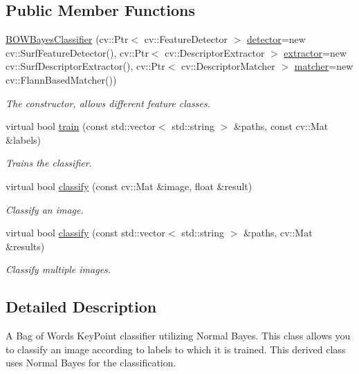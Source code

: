 \subsection*{Public Member Functions}
\begin{DoxyCompactItemize}
\item 
\hyperlink{classBOWBayesClassifier_ab0714186c37d370dfd71b02ff3de81e6}{BOWBayesClassifier} (cv::Ptr$<$ cv::FeatureDetector $>$ \hyperlink{classBOWClassifier_af98420aa410054ef3010f4c098931a41}{detector}=new cv::SurfFeatureDetector(), cv::Ptr$<$ cv::DescriptorExtractor $>$ \hyperlink{classBOWClassifier_a429b9a83879611a7c3e06eeacec9fb18}{extractor}=new cv::SurfDescriptorExtractor(), cv::Ptr$<$ cv::DescriptorMatcher $>$ \hyperlink{classBOWClassifier_a35057956434d92402d24f2628cfaf35c}{matcher}=new cv::FlannBasedMatcher())
\begin{DoxyCompactList}\small\item\em The constructor, allows different feature classes. \item\end{DoxyCompactList}\item 
virtual bool \hyperlink{classBOWBayesClassifier_a66e43076ec168747b903705ea2448939}{train} (const std::vector$<$ std::string $>$ \&paths, const cv::Mat \&labels)
\begin{DoxyCompactList}\small\item\em Trains the classifier. \item\end{DoxyCompactList}\item 
virtual bool \hyperlink{classBOWBayesClassifier_a360c377b335ad194f73c1659795afef5}{classify} (const cv::Mat \&image, float \&result)
\begin{DoxyCompactList}\small\item\em Classify an image. \item\end{DoxyCompactList}\item 
virtual bool \hyperlink{classBOWBayesClassifier_a3e2cf634f1f63dd14de1ca658b19cb39}{classify} (const std::vector$<$ std::string $>$ \&paths, cv::Mat \&results)
\begin{DoxyCompactList}\small\item\em Classify multiple images. \item\end{DoxyCompactList}\end{DoxyCompactItemize}


\subsection{Detailed Description}
A Bag of Words KeyPoint classifier utilizing Normal Bayes. This class allows you to classify an image according to labels to which it is trained. This derived class uses Normal Bayes for the classification. 

